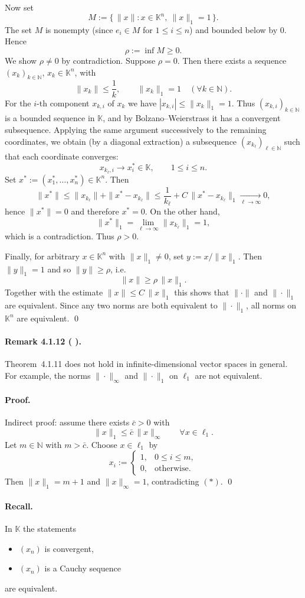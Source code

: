 \documentclass[12pt,a4paper]{article}
\newcommand{\N}{\mathbb{N}}
\newcommand{\K}{\mathbb{K}} %
\newcommand{\NumberedRemark}[3]{%
\paragraph*{Remark #1 ( #2 ).} #3\par}
\theoremstyle{plain}
\theoremstyle{definition}
\theoremstyle{remark}
\begin{document}
	Now set
	\[
		M := \{\, \|x\| : x\in\K^{n},\ \|x\|_{1}=1\,\}.
	\]
	The set $M$ is nonempty (since $e_i\in M$ for $1\le i\le n$) and bounded below by $0$. Hence
	\[
		\rho := \inf M \ge 0.
	\]
	We show $\rho\ne0$ by contradiction. Suppose $\rho=0$. Then there exists a sequence $(x_k)_{k\in\N}$, $x_k\in\K^{n}$, with
	\[
		\|x_k\| \le \frac{1}{k}, \qquad \|x_k\|_{1} = 1 \quad (\forall k\in\N).
	\]
	For the $i$-th component $x_{k,i}$ of $x_k$ we have $|x_{k,i}| \le \|x_k\|_{1} = 1$. Thus $(x_{k,i})_{k\in\N}$ is a bounded sequence in $\K$, and by Bolzano--Weierstrass it has a convergent subsequence. Applying the same argument successively to the remaining coordinates, we obtain (by a diagonal extraction) a subsequence $(x_{k_\ell})_{\ell\in\N}$ such that each coordinate converges:
	\[
		x_{k_\ell,i} \to x_i^{*} \in \K, \qquad 1\le i\le n.
	\]
	Set $x^{*} := (x_1^{*},\dots,x_n^{*})\in\K^{n}$. Then
	\[
		\|x^{*}\| \le \|x_{k_\ell}\| + \|x^{*}-x_{k_\ell}\| \le \frac{1}{k_\ell} + C\,\|x^{*}-x_{k_\ell}\|_{1} \xrightarrow[\ell\to\infty]{} 0,
	\]
	hence $\|x^{*}\|=0$ and therefore $x^{*}=0$. On the other hand,
	\[
		\|x^{*}\|_{1} = \lim_{\ell\to\infty} \|x_{k_\ell}\|_{1} = 1,
	\]
	which is a contradiction. Thus $\rho>0$.

	Finally, for arbitrary $x\in\K^{n}$ with $\|x\|_{1}\ne0$, set $y:=x/\|x\|_{1}$. Then $\|y\|_{1}=1$ and so $\|y\|\ge\rho$, i.e.
	\[
		\|x\| \ge \rho\,\|x\|_{1}.
	\]
	Together with the estimate $\|x\|\le C\,\|x\|_{1}$ this shows that $\|\cdot\|$ and $\|\cdot\|_{1}$ are equivalent. Since any two norms are both equivalent to $\|\cdot\|_{1}$, all norms on $\K^{n}$ are equivalent. \qed

	\NumberedRemark{4.1.12}{}{Theorem~4.1.11 does not hold in infinite-dimensional vector spaces in general. For example, the norms $\|\cdot\|_\infty$ and $\|\cdot\|_1$ on $\ell_1$ are not equivalent.}
	\paragraph{Proof.}
	Indirect proof: assume there exists $\bar c>0$ with
	\[
		\|x\|_{1} \le \bar c\,\|x\|_{\infty} \qquad \forall x\in\ell_{1}.\tag{$*$}
	\]
	Let $m\in\N$ with $m>\bar c$. Choose $x\in\ell_{1}$ by
	\[
		x_i := \begin{cases} 1,& 0\le i\le m,\\ 0,& \text{otherwise.} \end{cases}
	\]
	Then $\|x\|_{1}=m+1$ and $\|x\|_{\infty}=1$, contradicting $(*)$. \qed

	\paragraph{Recall.} In $\K$ the statements
	\begin{itemize}[leftmargin=*]
		\item $(x_n)$ is convergent,
		\item $(x_n)$ is a Cauchy sequence
	\end{itemize}
	are equivalent.
\end{document}
